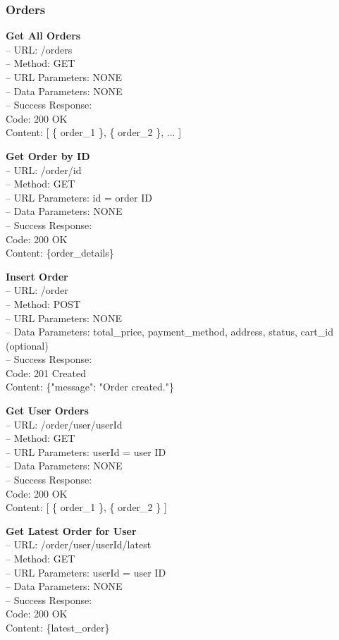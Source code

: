 \subsubsection*{Orders}

\textbf{Get All Orders} \\
– URL: /orders \\
– Method: GET \\
– URL Parameters: NONE \\
– Data Parameters: NONE \\
– Success Response: \\
Code: 200 OK \\
Content: [ \{ order_1 \}, \{ order_2 \}, ... ]

\textbf{Get Order by ID} \\
– URL: /order/{id} \\
– Method: GET \\
– URL Parameters: id = order ID \\
– Data Parameters: NONE \\
– Success Response: \\
Code: 200 OK \\
Content: \{order_details\}

\textbf{Insert Order} \\
– URL: /order \\
– Method: POST \\
– URL Parameters: NONE \\
– Data Parameters: total_price, payment_method, address, status, cart_id (optional) \\
– Success Response: \\
Code: 201 Created \\
Content: \{"message": "Order created."\}

\textbf{Get User Orders} \\
– URL: /order/user/{userId} \\
– Method: GET \\
– URL Parameters: userId = user ID \\
– Data Parameters: NONE \\
– Success Response: \\
Code: 200 OK \\
Content: [ \{ order_1 \}, \{ order_2 \} ]

\textbf{Get Latest Order for User} \\
– URL: /order/user/{userId}/latest \\
– Method: GET \\
– URL Parameters: userId = user ID \\
– Data Parameters: NONE \\
– Success Response: \\
Code: 200 OK \\
Content: \{latest_order\}

